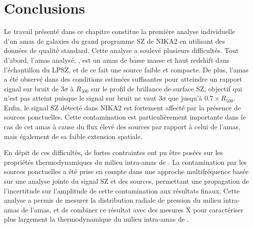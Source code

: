 \section{Conclusions}

Le travail présenté dans ce chapitre constitue la première analyse individuelle d'un amas de galaxies du grand programme SZ de NIKA2 en utilisant des données de qualité standard.
Cette analyse a soulevé plusieurs difficultés.
Tout d'abord, l'amas analysé, \act, est un amas de basse masse et haut redshift dans l'échantillon du LPSZ, et de ce fait une source faible et compacte.
De plus, l'amas a été observé dans des conditions estimées suffisantes pour atteindre un rapport signal sur bruit de $3\sigma$ à $R_{500}$ sur le profil de brillance de surface SZ, objectif qui n'est pas atteint puisque le signal sur bruit ne vaut $3\sigma$ que jusqu'à $0.7 \times R_{500}$.
Enfin, le signal SZ détecté dans NIKA2 est fortement affecté par la présence de sources ponctuelles.
Cette contamination est particulièrement importante dans le cas de cet amas à cause du flux élevé des sources par rapport à celui de l'amas, mais également de sa faible extension spatiale.

En dépit de ces difficultés, de fortes contraintes ont pu être posées sur les propriétés thermodynamiques du milieu intra-amas de \act.
La contamination par les sources ponctuelles a été prise en compte dans une approche multifréquence basée sur une analyse jointe du signal SZ et des sources, permettant une propagation de l'incertitude sur l'amplitude de cette contamination aux résultats finaux.
Cette analyse a permis de mesurer la distribution radiale de pression du milieu intra-amas de l'amas, et de combiner ce résultat avec des mesures X pour caractériser plus largement la thermodynamique du milieu intra-amas de \act.

